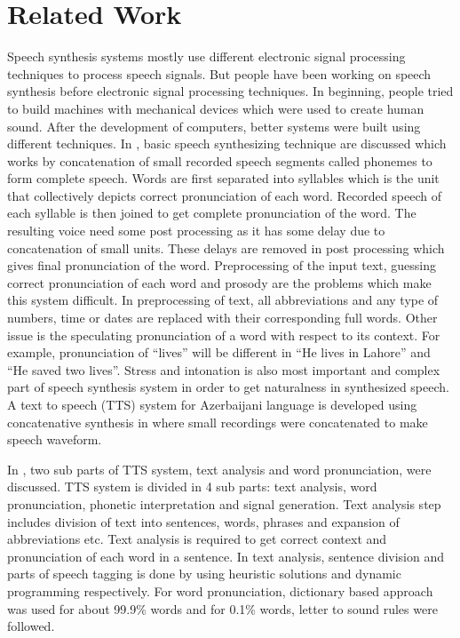 \chapter{Related Work}

Speech synthesis systems mostly use different electronic signal processing techniques to process speech signals. But people have been working on speech synthesis before electronic signal processing techniques. In beginning, people tried to build machines with mechanical devices which were used to create human sound. After the development of computers, better systems were built using different techniques. In \cite{swetha2013text}, basic speech synthesizing technique are discussed which works by concatenation of small recorded speech segments called phonemes to form complete speech. Words are first separated into syllables which is the unit that collectively depicts correct pronunciation of each word. Recorded speech of each syllable is then joined to get complete pronunciation of the word. The resulting voice need some post processing as it has some delay due to concatenation of small units. These delays are removed in post processing which gives final pronunciation of the word. Preprocessing of the input text, guessing correct pronunciation of each word and prosody are the problems which make this system difficult. In preprocessing of text, all abbreviations and any type of numbers, time or dates are replaced with their corresponding full words. Other issue is the speculating pronunciation of a word with respect to its context. For example, pronunciation of “lives” will be different in “He lives in Lahore” and “He saved two lives”. Stress and intonation is also most important and complex part of speech synthesis system in order to get naturalness in synthesized speech. A text to speech (TTS) system for Azerbaijani language is developed using concatenative synthesis in \cite{aida2010main} where small recordings were concatenated to make speech waveform.

In \cite{liberman1992text}, two sub parts of TTS system, text analysis and word pronunciation, were discussed. TTS system is divided in 4 sub parts: text analysis, word pronunciation, phonetic interpretation and signal generation. Text analysis step includes division of text into sentences, words, phrases and expansion of abbreviations etc. Text analysis is required to get correct context and pronunciation of each word in a sentence. In text analysis, sentence division and parts of speech tagging is done by using heuristic solutions \cite{riley1989some} and dynamic programming respectively. For word pronunciation, dictionary based approach was used for about 99.9\% words and for 0.1\% words, letter to sound rules were followed. 

